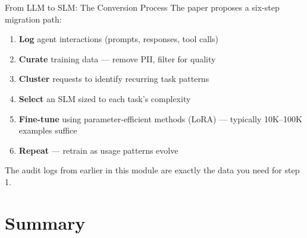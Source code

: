 \documentclass[aspectratio=169]{beamer}
\begin{document}
\begin{frame}{From LLM to SLM: The Conversion Process}
The paper proposes a six-step migration path:
\vspace{0.3cm}
\begin{enumerate}
  \item \textbf{Log} agent interactions (prompts, responses, tool calls)
  \item \textbf{Curate} training data --- remove PII, filter for quality
  \item \textbf{Cluster} requests to identify recurring task patterns
  \item \textbf{Select} an SLM sized to each task's complexity
  \item \textbf{Fine-tune} using parameter-efficient methods (LoRA) --- typically 10K--100K examples suffice
  \item \textbf{Repeat} --- retrain as usage patterns evolve
\end{enumerate}
\vspace{0.3cm}
\alert{The audit logs from earlier in this module are exactly the data you need for step 1.}
\end{frame}

\section{Summary}
\end{document}
